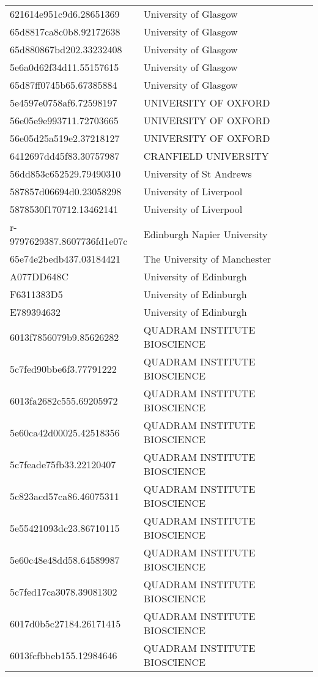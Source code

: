 \begin{tabular}{ll}
621614e951c9d6.28651369 & University of Glasgow \\
65d8817ca8c0b8.92172638 & University of Glasgow \\
65d880867bd202.33232408 & University of Glasgow \\
5e6a0d62f34d11.55157615 & University of Glasgow \\
65d87ff0745b65.67385884 & University of Glasgow \\
5e4597e0758af6.72598197 & UNIVERSITY OF OXFORD \\
56e05e9e993711.72703665 & UNIVERSITY OF OXFORD \\
56e05d25a519e2.37218127 & UNIVERSITY OF OXFORD \\
6412697dd45f83.30757987 & CRANFIELD UNIVERSITY \\
56dd853c652529.79490310 & University of St Andrews \\
587857d06694d0.23058298 & University of Liverpool \\
5878530f170712.13462141 & University of Liverpool \\
r-9797629387.8607736fd1e07c & Edinburgh Napier University \\
65e74e2bedb437.03184421 & The University of Manchester \\
A077DD648C & University of Edinburgh \\
F6311383D5 & University of Edinburgh \\
E789394632 & University of Edinburgh \\
6013f7856079b9.85626282 & QUADRAM INSTITUTE BIOSCIENCE \\
5c7fed90bbe6f3.77791222 & QUADRAM INSTITUTE BIOSCIENCE \\
6013fa2682c555.69205972 & QUADRAM INSTITUTE BIOSCIENCE \\
5e60ca42d00025.42518356 & QUADRAM INSTITUTE BIOSCIENCE \\
5c7feade75fb33.22120407 & QUADRAM INSTITUTE BIOSCIENCE \\
5c823acd57ca86.46075311 & QUADRAM INSTITUTE BIOSCIENCE \\
5e55421093dc23.86710115 & QUADRAM INSTITUTE BIOSCIENCE \\
5e60c48e48dd58.64589987 & QUADRAM INSTITUTE BIOSCIENCE \\
5c7fed17ca3078.39081302 & QUADRAM INSTITUTE BIOSCIENCE \\
6017d0b5c27184.26171415 & QUADRAM INSTITUTE BIOSCIENCE \\
6013fcfbbeb155.12984646 & QUADRAM INSTITUTE BIOSCIENCE \\

\end{tabular}
